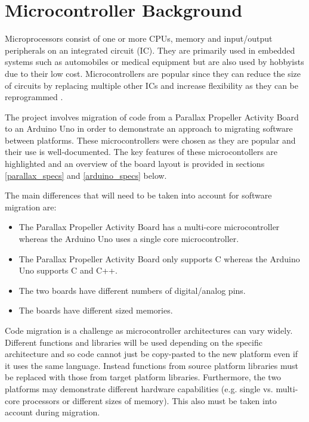 \documentclass{UoYCSproject}
\begin{document}
\section{Microcontroller Background} \label{mc_bg}
Microprocessors consist of one or more CPUs, memory and input/output peripherals on an integrated circuit (IC). They are primarily used in embedded systems such as automobiles or medical equipment but are also used by hobbyists due to their low cost. Microcontrollers are popular since they can reduce the size of circuits by replacing multiple other ICs and increase flexibility as they can be reprogrammed \parencite{bbcmicrocontrollers}.

The project involves migration of code from a Parallax Propeller Activity Board to an Arduino Uno in order to demonstrate an approach to migrating software between platforms. These microcontrollers were chosen as they are popular and their use is well-documented. The key features of these microcontollers are highlighted and an overview of the board layout is provided in sections \ref{parallax_specs} and \ref{arduino_specs} below. 

\pagebreak The main differences that will need to be taken into account for software migration are:
\begin{itemize}
\item The Parallax Propeller Activity Board has a multi-core microcontroller whereas the Arduino Uno uses a single core microcontroller.
\item The Parallax Propeller Activity Board only supports C whereas the Arduino Uno supports C and C++.
\item The two boards have different numbers of digital/analog pins.
\item The boards have different sized memories.
\end{itemize}

Code migration is a challenge as microcontroller architectures can vary widely. Different functions and libraries will be used depending on the specific architecture and so code cannot just be copy-pasted to the new platform even if it uses the same language. Instead functions from source platform libraries must be replaced with those from target platform libraries. Furthermore, the two platforms may demonstrate different hardware capabilities (e.g. single vs. multi-core processors or different sizes of memory). This also must be taken into account during migration.
\end{document}
